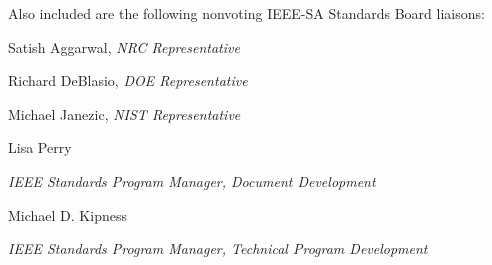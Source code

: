 \vspace{9.5pt}
\hspace*{27pt}{\frontNames *Member Emeritus}\par

\vspace{20.6pt}
Also included are the following nonvoting IEEE-SA Standards Board liaisons:\par

\vspace{12.66pt}
{\centering\rmfamily\fontsize{9pt}{11pt}\selectfont
Satish Aggarwal, \textit{NRC Representative}\par
Richard DeBlasio, \textit{DOE Representative}\par
Michael Janezic, \textit{NIST Representative}\par

\vspace{11pt}
Lisa Perry\par
\textit{IEEE Standards Program Manager, Document Development}\par

\vspace{11pt}
Michael D. Kipness\par
\textit{IEEE Standards Program Manager, Technical Program Development}\par}
\endgroup
\clearpage

